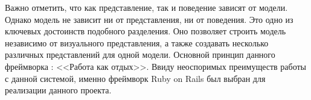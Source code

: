 \hspace*{0.5cm}Важно отметить, что как представление, так и поведение зависят от модели. Однако модель не зависит ни от представления, ни от поведения. Это одно из ключевых достоинств подобного разделения. Оно позволяет строить модель независимо от визуального представления, а также создавать несколько различных представлений для одной модели.
\hspace*{0.5cm}Основной принцип данного фреймворка : <<Работа как отдых>>. Ввиду неоспоримых преимуществ работы с данной системой, именно фреймворк Ruby on Rails был выбран для реализации данного проекта.\\  
\endinput

